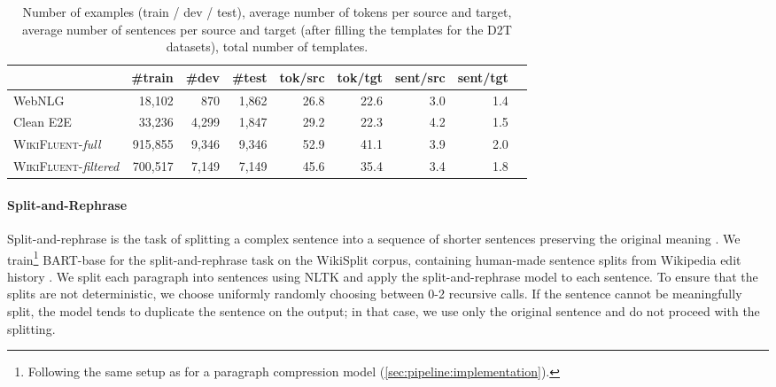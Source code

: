 \begin{table}[t]
    \centering
    \footnotesize
    \begin{tabular}{l rrrrrrrr}\toprule
                                              & \bf  \#train & \bf \#dev & \bf \#test & \bf tok/src & \bf tok/tgt & \bf sent/src & \bf sent/tgt \\  \midrule
        WebNLG                                & 18,102       & 870       & 1,862      & 26.8        & 22.6        & 3.0          & 1.4          \\
        Clean E2E                             & 33,236       & 4,299     & 1,847      & 29.2        & 22.3        & 4.2          & 1.5          \\ \midrule
        \textsc{WikiFluent}-\textit{full}     & 915,855      & 9,346     & 9,346      & 52.9        & 41.1        & 3.9          & 2.0          \\
        \textsc{WikiFluent}-\textit{filtered} & 700,517      & 7,149     & 7,149      & 45.6        & 35.4        & 3.4          & 1.8          \\ \bottomrule
    \end{tabular}
    \caption{Number of examples (train / dev / test), average number of tokens per source and target, average number of sentences per source and target (after filling the templates for the D2T datasets), total number of templates.}
    \label{tab:stats}
\end{table}

\paragraph{Split-and-Rephrase} Split-and-rephrase is the task of splitting a complex sentence into a sequence of shorter sentences preserving the original meaning \citep{narayan-etal-2017-split}. We train\footnote{Following the same setup as for a paragraph compression model (\autoref{sec:pipeline:implementation}).} BART-base \cite{lewisBARTDenoisingSequencetoSequence2019} for the split-and-rephrase task on the WikiSplit corpus, containing human-made sentence splits from Wikipedia edit history \cite{botha-etal-2018-learning}.  We split each paragraph into sentences using NLTK \cite{bird2006nltk} and apply the split-and-rephrase model to each sentence. To ensure that the splits are not deterministic, we choose uniformly randomly choosing between 0-2 recursive calls. If the sentence cannot be meaningfully split, the model tends to duplicate the sentence on the output; in that case, we use only the original sentence and do not proceed with the splitting.


